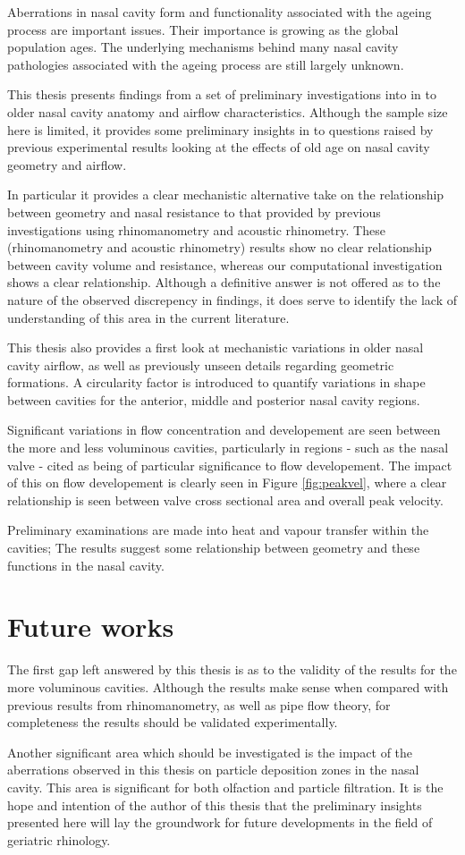 Aberrations in nasal cavity form and functionality associated with the ageing process are important issues. 
Their importance is growing as the global population ages.
The underlying mechanisms behind many nasal cavity pathologies associated with the ageing process are still largely unknown.

This thesis presents findings from a set of preliminary investigations into in to older nasal cavity anatomy and airflow characteristics.
Although the sample size here is limited, it provides some preliminary insights in to questions raised by previous experimental results looking at the effects of old age on nasal cavity geometry and airflow.

In particular it provides a clear mechanistic alternative take on the relationship between geometry and nasal resistance to that provided by previous investigations using rhinomanometry and acoustic rhinometry. These (rhinomanometry and acoustic rhinometry) results show no clear relationship between cavity volume and resistance, whereas our computational investigation shows a clear relationship. Although a definitive answer is not offered as to the nature of the observed discrepency in findings, it does serve to identify the lack of understanding of this area in the current literature.

This thesis also provides a first look at mechanistic variations in older nasal cavity airflow, as well as previously unseen details regarding geometric formations. A circularity factor is introduced to quantify variations in shape between cavities for the anterior, middle and posterior nasal cavity regions.

Significant variations in flow concentration and developement are seen between the more and less voluminous cavities, particularly in regions - such as the nasal valve - cited as being of particular significance to flow developement. The impact of this on flow developement is clearly seen in Figure \ref{fig:peakvel}, where a clear relationship is seen between valve cross sectional area and overall peak velocity.

Preliminary examinations are made into heat and vapour transfer within the cavities; The results suggest some relationship between geometry and these functions in the nasal cavity.

\section{Future works}
The first gap left answered by this thesis is as to the validity of the results for the more voluminous cavities.
Although the results make sense when compared with previous results from rhinomanometry, as well as pipe flow theory, for completeness the results should be validated experimentally.

Another significant area which should be investigated is the impact of the aberrations observed in this thesis on particle deposition zones in the nasal cavity.
This area is significant for both olfaction and particle filtration.
It is the hope and intention of the author of this thesis that the preliminary insights presented here will lay the groundwork for future developments in the field of geriatric rhinology.
